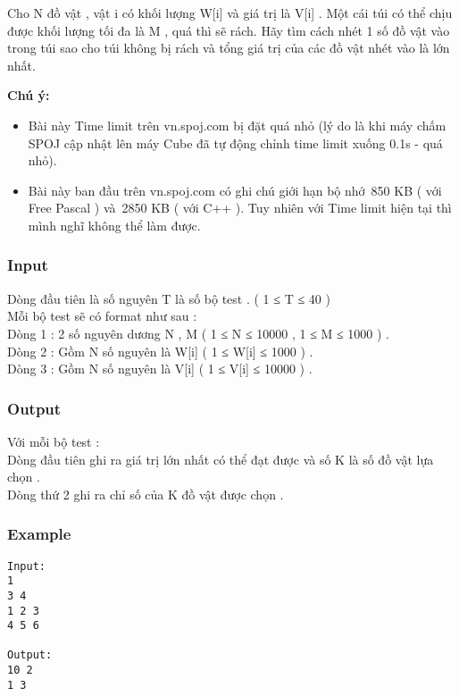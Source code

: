 

Cho N đồ vật , vật i có khối lượng W[i] và giá trị là V[i] . Một cái túi có thể chịu được khối lượng tối đa là M , quá thì sẽ rách. Hãy tìm cách nhét 1 số đồ vật vào trong túi sao cho túi không bị rách và tổng giá trị của các đồ vật nhét vào là lớn nhất.

\textbf{Chú ý:}
\begin{itemize}
	\item Bài này Time limit trên vn.spoj.com bị đặt quá nhỏ (lý do là khi máy chấm SPOJ cập nhật lên máy Cube đã tự động chỉnh time limit xuống 0.1s - quá nhỏ).
	\item Bài này ban đầu trên vn.spoj.com có ghi chú giới hạn bộ nhớ 850 KB ( với Free Pascal ) và 2850 KB ( với C++ ). Tuy nhiên với Time limit hiện tại thì mình nghĩ không thể làm được.
\end{itemize}

\subsubsection{Input}

Dòng đầu tiên là số nguyên T là số bộ test . ( 1 ≤ T ≤ 40 )
\\Mỗi bộ test sẽ có format như sau :
\\Dòng 1 : 2 số nguyên dương N , M ( 1 ≤ N ≤ 10000 , 1 ≤ M ≤ 1000 ) .
\\Dòng 2 : Gồm N số nguyên là W[i] ( 1 ≤ W[i] ≤ 1000 ) .
\\Dòng 3 : Gồm N số nguyên là V[i] ( 1 ≤ V[i] ≤ 10000 ) .

\subsubsection{Output}

Với mỗi bộ test :
\\Dòng đầu tiên ghi ra giá trị lớn nhất có thể đạt được và số K là số đồ vật lựa chọn .
\\Dòng thứ 2 ghi ra chỉ số của K đồ vật được chọn .

\subsubsection{Example}
\begin{verbatim}
Input:
1
3 4
1 2 3
4 5 6

Output:
10 2
1 3\end{verbatim}
